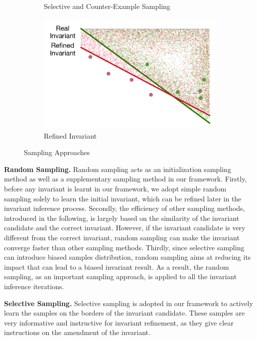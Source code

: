 \begin{figure}[!h]
\begin{subfigure}{0.23\textwidth}
        \caption{Selective and Counter-Example Sampling}
        \label{fig:sampling:selective}
    \end{subfigure}
    \begin{subfigure}{0.23\textwidth}
        \centering
        \includegraphics[scale=0.3]{figures/general-sampling-3.pdf}
        \caption{Refined Invariant}
        \label{fig:sampling:selective:invariant}
    \end{subfigure}
    \caption{Sampling Approaches}
    \label{fig:sampling}
\end{figure}

\medskip\noindent
\textbf{Random Sampling.}
Random sampling acts as an initialization sampling method 
as well as a supplementary sampling method in our framework. 
Firstly, before any invariant is learnt in our framework, 
we adopt simple random sampling solely to learn the initial invariant, 
which can be refined later in the invariant inference process. 
Secondly, the efficiency of other sampling methods, introduced in the following, 
is largely based on the similarity of the invariant candidate and the correct invariant. 
However, if the invariant candidate is very different from the correct invariant, 
random sampling can make the invariant converge faster than other sampling methods. 
Thirdly, since selective sampling can introduce biased samples distribution, 
random sampling aims at reducing its impact that can lead to a biased invariant result. 
As a result, the random sampling, as an important sampling approach, 
is applied to all the invariant inference iterations. 

\medskip\noindent
\textbf{Selective Sampling.}
Selective sampling is adopted in our framework to actively learn the samples 
on the borders of the invariant candidate. 
These samples are very informative and instructive for invariant refinement, 
as they give clear instructions on the amendment of the invariant. 

